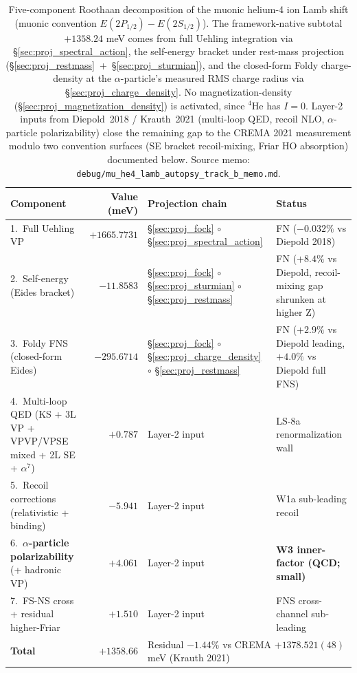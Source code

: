 \documentclass[11pt]{article}
\begin{document}
\begin{table}[h!]
\centering\small
\caption{Five-component Roothaan decomposition of the muonic helium-4
ion Lamb shift (muonic convention $E(2P_{1/2})-E(2S_{1/2})$).  The
framework-native subtotal $+1358.24$ meV comes from full Uehling
integration via \S\ref{sec:proj_spectral_action}, the self-energy
bracket under rest-mass projection
(\S\ref{sec:proj_restmass}~+~\S\ref{sec:proj_sturmian}), and the
closed-form Foldy charge-density at the $\alpha$-particle's measured
RMS charge radius via \S\ref{sec:proj_charge_density}.  No
magnetization-density (\S\ref{sec:proj_magnetization_density}) is
activated, since $^4$He has $I=0$.  Layer-2 inputs from
Diepold~2018 / Krauth~2021 (multi-loop QED, recoil NLO,
$\alpha$-particle polarizability) close the remaining gap to the
CREMA 2021 measurement modulo two convention surfaces (SE bracket
recoil-mixing, Friar HO absorption) documented below.  Source memo:
\texttt{debug/mu\_he4\_lamb\_autopsy\_track\_b\_memo.md}.}
\label{tab:autopsy_muhe4_lamb}
\begin{tabular}{p{4.7cm} r p{4.8cm} l}
\toprule
Component & Value (meV) & Projection chain & Status \\
\midrule
1.~Full Uehling VP & $+1665.7731$ &
\S\ref{sec:proj_fock} $\circ$ \S\ref{sec:proj_spectral_action}
& FN ($-0.032\%$ vs Diepold 2018) \\
2.~Self-energy (Eides bracket) & $-11.8583$ &
\S\ref{sec:proj_fock} $\circ$ \S\ref{sec:proj_sturmian}
$\circ$ \S\ref{sec:proj_restmass}
& FN ($+8.4\%$ vs Diepold, recoil-mixing gap shrunken at higher Z) \\
3.~Foldy FNS (closed-form Eides) & $-295.6714$ &
\S\ref{sec:proj_fock} $\circ$ \S\ref{sec:proj_charge_density}
$\circ$ \S\ref{sec:proj_restmass}
& FN ($+2.9\%$ vs Diepold leading, $+4.0\%$ vs Diepold full FNS) \\
4.~Multi-loop QED (KS + 3L VP + VPVP/VPSE mixed + 2L SE + $\alpha^7$) & $+0.787$ &
Layer-2 input & LS-8a renormalization wall \\
5.~Recoil corrections (relativistic + binding) & $-5.941$ &
Layer-2 input & W1a sub-leading recoil \\
6.~\textbf{$\alpha$-particle polarizability} (+ hadronic VP) & $\mathbf{+4.061}$ &
Layer-2 input & \textbf{W3 inner-factor (QCD; small)} \\
7.~FS-NS cross + residual higher-Friar & $+1.510$ &
Layer-2 input & FNS cross-channel sub-leading \\
\midrule
\textbf{Total} & $+1358.66$ & \multicolumn{2}{l}{Residual
$-1.44\%$ vs CREMA $+1378.521(48)$ meV (Krauth 2021)} \\
\bottomrule
\end{tabular}
\end{table}
\end{document}
